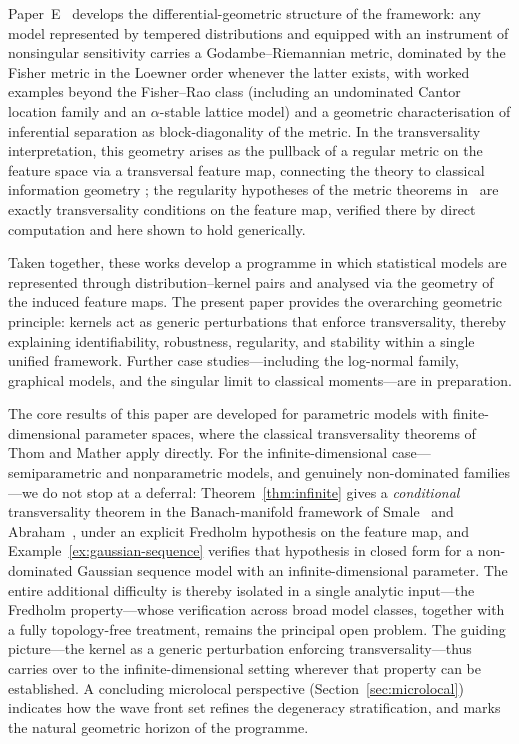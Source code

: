 \documentclass[11pt,a4paper]{article}
\begin{document}
Paper~E~\cite{E} develops the differential-geometric structure of the
framework: any model represented by tempered distributions and equipped
with an instrument of nonsingular sensitivity carries a
Godambe--Riemannian metric, dominated by the Fisher metric in the
Loewner order whenever the latter exists, with worked examples beyond
the Fisher--Rao class (including an undominated Cantor location family
and an $\alpha$-stable lattice model) and a geometric characterisation
of inferential separation as block-diagonality of the metric. In the
transversality interpretation, this geometry arises as the pullback of
a regular metric on the feature space via a transversal feature map,
connecting the theory to classical information geometry
\cite{Amari1985,BarndorffNielsen1978}; the regularity hypotheses of the
metric theorems in~\cite{E} are exactly transversality conditions on
the feature map, verified there by direct computation and here shown
to hold generically.

\medskip

Taken together, these works develop a programme in which statistical models
are represented through distribution--kernel pairs and analysed via the
geometry of the induced feature maps.  The present paper provides the
overarching geometric principle: kernels act as generic perturbations that
enforce transversality, thereby explaining identifiability, robustness,
regularity, and stability within a single unified framework.
Further case studies---including the log-normal family, graphical
models, and the singular limit to classical moments---are in
preparation.

The core results of this paper are developed for parametric models with
finite-dimensional parameter spaces, where the classical transversality
theorems of Thom and Mather apply directly.  For the infinite-dimensional
case---semiparametric and nonparametric models, and genuinely non-dominated
families---we do not stop at a deferral: Theorem~\ref{thm:infinite} gives a
\emph{conditional} transversality theorem in the Banach-manifold framework of
Smale~\cite{Smale1965} and Abraham~\cite{Abraham1963}, under an explicit
Fredholm hypothesis on the feature map, and Example~\ref{ex:gaussian-sequence}
verifies that hypothesis in closed form for a non-dominated Gaussian sequence
model with an infinite-dimensional parameter.  The entire additional difficulty
is thereby isolated in a single analytic input---the Fredholm property---whose
verification across broad model classes, together with a fully topology-free
treatment, remains the principal open problem.  The guiding picture---the kernel
as a generic perturbation enforcing transversality---thus carries over to the
infinite-dimensional setting wherever that property can be established.  A
concluding microlocal perspective (Section~\ref{sec:microlocal}) indicates how
the wave front set refines the degeneracy stratification, and marks the natural
geometric horizon of the programme.
\end{document}
